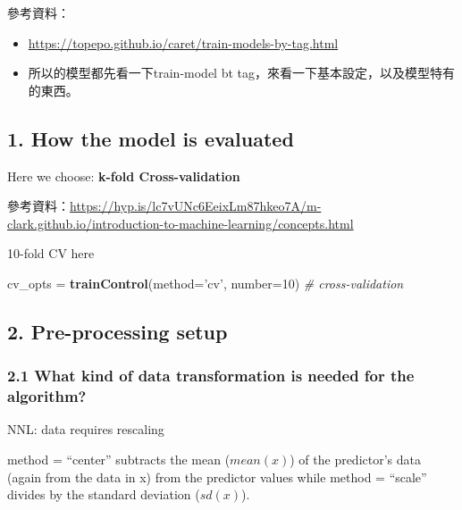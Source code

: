 \documentclass[]{book}
\newenvironment{Shaded}{\begin{snugshade}}{\end{snugshade}}
\newcommand{\KeywordTok}[1]{\textcolor[rgb]{0.13,0.29,0.53}{\textbf{#1}}}
\newcommand{\DataTypeTok}[1]{\textcolor[rgb]{0.13,0.29,0.53}{#1}}
\newcommand{\DecValTok}[1]{\textcolor[rgb]{0.00,0.00,0.81}{#1}}
\newcommand{\StringTok}[1]{\textcolor[rgb]{0.31,0.60,0.02}{#1}}
\newcommand{\CommentTok}[1]{\textcolor[rgb]{0.56,0.35,0.01}{\textit{#1}}}
\newcommand{\NormalTok}[1]{#1}
\begin{document}
參考資料：

\begin{itemize}
\item
  \url{https://topepo.github.io/caret/train-models-by-tag.html}
\item
  所以的模型都先看一下train-model bt tag，來看一下基本設定，以及模型特有的東西。
\end{itemize}

\hypertarget{how-the-model-is-evaluated-1}{%
\subsection{1. How the model is evaluated}\label{how-the-model-is-evaluated-1}}

Here we choose: \textbf{k-fold Cross-validation}

參考資料：\url{https://hyp.is/lc7vUNc6EeixLm87hkeo7A/m-clark.github.io/introduction-to-machine-learning/concepts.html}

10-fold CV here

\begin{Shaded}
\begin{Highlighting}[]
\NormalTok{cv_opts =}\StringTok{ }\KeywordTok{trainControl}\NormalTok{(}\DataTypeTok{method=}\StringTok{'cv'}\NormalTok{, }\DataTypeTok{number=}\DecValTok{10}\NormalTok{) }\CommentTok{# cross-validation }
\end{Highlighting}
\end{Shaded}

\hypertarget{pre-processing-setup-1}{%
\subsection{2. Pre-processing setup}\label{pre-processing-setup-1}}

\hypertarget{what-kind-of-data-transformation-is-needed-for-the-algorithm-1}{%
\subsubsection{2.1 What kind of data transformation is needed for the algorithm?}\label{what-kind-of-data-transformation-is-needed-for-the-algorithm-1}}

NNL: data requires rescaling

method = ``center'' subtracts the mean (\(mean(x)\)) of the predictor's data (again from the data in x) from the predictor values while method = ``scale'' divides by the standard deviation (\(sd(x)\)).
\end{document}
